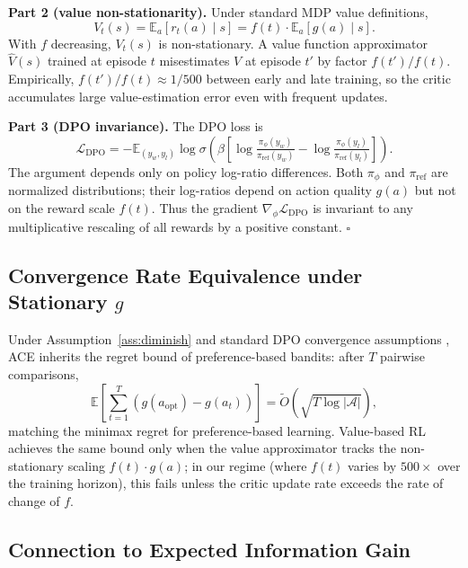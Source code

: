\textbf{Part 2 (value non-stationarity).} Under standard MDP value definitions,
\[V_t(s) = \mathbb{E}_a[r_t(a) \mid s] = f(t) \cdot \mathbb{E}_a[g(a) \mid s].\]
With $f$ decreasing, $V_t(s)$ is non-stationary. A value function approximator $\hat{V}(s)$ trained at episode $t$ misestimates $V$ at episode $t'$ by factor $f(t')/f(t)$. Empirically, $f(t')/f(t) \approx 1/500$ between early and late training, so the critic accumulates large value-estimation error even with frequent updates.

\textbf{Part 3 (DPO invariance).} The DPO loss is
\[\mathcal{L}_\text{DPO} = -\mathbb{E}_{(y_w, y_l)} \log \sigma\!\left(\beta \left[\log\tfrac{\pi_\phi(y_w)}{\pi_\text{ref}(y_w)} - \log\tfrac{\pi_\phi(y_l)}{\pi_\text{ref}(y_l)}\right]\right).\]
The argument depends only on policy log-ratio differences. Both $\pi_\phi$ and $\pi_\text{ref}$ are normalized distributions; their log-ratios depend on action quality $g(a)$ but not on the reward scale $f(t)$. Thus the gradient $\nabla_\phi \mathcal{L}_\text{DPO}$ is invariant to any multiplicative rescaling of all rewards by a positive constant. \hfill$\square$

\subsection{Convergence Rate Equivalence under Stationary $g$}
\label{app:convergence}

Under Assumption~\ref{ass:diminish} and standard DPO convergence assumptions \citep{rafailov2023direct}, ACE inherits the regret bound of preference-based bandits: after $T$ pairwise comparisons,
\[\mathbb{E}\!\left[\sum_{t=1}^T (g(a_\text{opt}) - g(a_t))\right] = \tilde{O}(\sqrt{T \log |\mathcal{A}|}),\]
matching the minimax regret for preference-based learning. Value-based RL achieves the same bound only when the value approximator tracks the non-stationary scaling $f(t) \cdot g(a)$; in our regime (where $f(t)$ varies by $500\times$ over the training horizon), this fails unless the critic update rate exceeds the rate of change of $f$.

\subsection{Connection to Expected Information Gain}
\label{app:info-gain}


